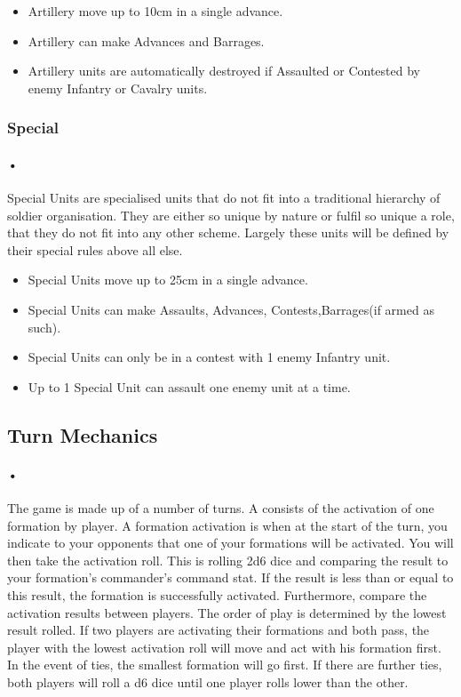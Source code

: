 \documentclass[12pt]{article}
\begin{document}
\begin{itemize}
\item Artillery move up to 10cm in a single advance.
\item Artillery can make Advances and Barrages.
\item Artillery units are automatically destroyed if Assaulted or Contested by enemy Infantry or Cavalry units.
\end{itemize}

\subsubsection{Special}
\paragraph{•}
Special Units are specialised units that do not fit into a traditional hierarchy of soldier organisation. They are either so unique by nature or fulfil so unique a role, that they do not fit into any other scheme. Largely these units will be defined by their special rules above all else.

\begin{itemize}
\item Special Units move up to 25cm in a single advance.
\item Special Units can make Assaults, Advances, Contests,Barrages(if armed as such).
\item Special Units  can only be in a contest with 1 enemy Infantry unit.
\item Up to 1 Special Unit can assault one enemy unit at a time.
\end{itemize}

\subsection{Turn Mechanics}
\paragraph{•}
The game is made up of a number of turns. A consists of the activation of one formation by player. A formation activation is when at the start of the turn, you indicate to your opponents that one of your formations will be activated. You will then take the activation roll. This is rolling 2d6 dice and comparing the result to your formation's commander's command stat. If the result is less than or equal to this result, the formation is successfully activated. Furthermore, compare the activation results between players. The order of play is determined by the lowest result rolled. If two players are activating their formations and both pass, the player with the lowest activation roll will move and act with his formation first. In the event of ties, the smallest formation will go first. If there are further ties, both players will roll a d6 dice until one player rolls lower than the other.
\end{document}
